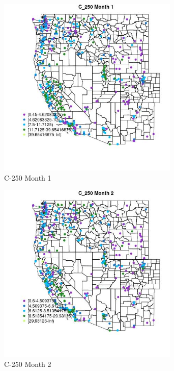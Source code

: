 \begin{figure} 
\centering  
\includegraphics[width=0.77\textwidth]{Code_Outputs/ML_input_report_ML_input_PM25_Step5_part_d_de_duplicated_aves_ML_input_MapObsMo1C_250.jpg} 
\caption{\label{fig:ML_input_report_ML_input_PM25_Step5_part_d_de_duplicated_aves_ML_inputMapObsMo1C_250}C-250 Month 1} 
\end{figure} 
 

\begin{figure} 
\centering  
\includegraphics[width=0.77\textwidth]{Code_Outputs/ML_input_report_ML_input_PM25_Step5_part_d_de_duplicated_aves_ML_input_MapObsMo2C_250.jpg} 
\caption{\label{fig:ML_input_report_ML_input_PM25_Step5_part_d_de_duplicated_aves_ML_inputMapObsMo2C_250}C-250 Month 2} 
\end{figure} 
 

